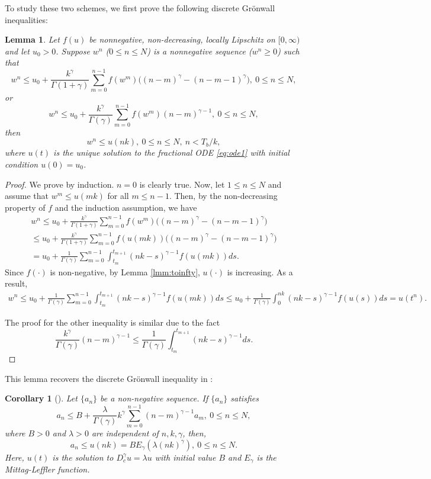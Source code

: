 \documentclass[12pt]{amsart}%
\newtheorem{lmm}[thm]{Lemma}
\newtheorem{cor}[thm]{Corollary}
\theoremstyle{definition}
\theoremstyle{remark}
\renewcommand{\ge}{\geqslant}
\renewcommand{\le}{\leqslant}
\begin{document}
To study these two schemes, we first prove the following discrete Gr\"{o}nwall inequalities:
\begin{lmm}\label{lmm:discretegronwall1}
Let $f(u)$ be nonnegative, non-decreasing, locally Lipschitz on $[0,\infty)$ and let $u_0>0$. 
Suppose $w^n$ ($0\le n\le N$) is a nonnegative sequence ($w^n\ge 0$) such that 
\[
w^{n}\le u_0+\frac{k^{\gamma}}{\Gamma(1+\gamma)}\sum_{m=0}^{n-1} f(w^{m})\Big((n-m)^{\gamma}-(n-m-1)^{\gamma}\Big),
~ 0\le n\le N,
\] 
or 
\[
w^{n}\le u_0+\frac{k^{\gamma}}{\Gamma(\gamma)}\sum_{m=0}^{n-1} f(w^{m})(n-m)^{\gamma-1},~  0\le n\le N,
\]
then \[
w^n \le u(nk),~ 0\le n\le N,~n<T_b/k,
\]
where $u(t)$ is the unique solution to the fractional ODE \eqref{eq:ode1} with initial condition $u(0)=u_0$.
\end{lmm}

\begin{proof}
We prove by induction. $n=0$ is clearly true. Now, let $1\le n \le N$ and assume that $w^m\le u(mk)$ for all $m\le n-1$. Then, by the non-decreasing property of $f$ and the induction assumption, we have
\begin{multline*}
w^{n}\le u_0+\frac{k^{\gamma}}{\Gamma(1+\gamma)}\sum_{m=0}^{n-1} f(w^{m})\Big((n-m)^{\gamma}-(n-m-1)^{\gamma}\Big)\\
\le u_0+\frac{k^{\gamma}}{\Gamma(1+\gamma)}\sum_{m=0}^{n-1} f(u(mk))\Big((n-m)^{\gamma}-(n-m-1)^{\gamma}\Big)\\
=u_0+\frac{1}{\Gamma(\gamma)}\sum_{m=0}^{n-1} \int_{t_{m}}^{t_{m+1}}
(nk-s)^{\gamma-1}f(u(mk))ds.
\end{multline*} 
Since $f(\cdot)$ is non-negative, by Lemma \ref{lmm:toinfty}, $u(\cdot)$ is increasing. As a result,
\begin{multline*}
w^{n}\le u_0+\frac{1}{\Gamma(\gamma)}\sum_{m=0}^{n-1} \int_{t_{m}}^{t_{m+1}}
(nk-s)^{\gamma-1}f(u(mk))ds
\le u_0+\frac{1}{\Gamma(\gamma)}\int_0^{nk}(nk-s)^{\gamma-1}f(u(s))ds=u(t^n).
\end{multline*}


The proof for the other inequality is similar due to the fact \[
\frac{k^{\gamma}}{\Gamma(\gamma)}(n-m)^{\gamma-1}\le \frac{1}{\Gamma(\gamma)} \int_{t_{m}}^{t_{m+1}}
(nk-s)^{\gamma-1} ds.
\]
\end{proof}

This lemma recovers the discrete Gr\"{o}nwall inequality in \cite{dixon86}:
\begin{cor}[\cite{dixon86}]
Let $\{a_n\}$ be a non-negative sequence.  If $\{a_n\}$ satisfies $$
a_n\le B+\frac{\lambda}{\Gamma(\gamma)}k^{\gamma}\sum_{m=0}^{n-1}(n-m)^{\gamma-1}a_m,~0\le n\le N,
$$
where $B>0$ and $\lambda>0$ are independent of $n, k, \gamma$, then, $$
a_n\le u(nk)=BE_{\gamma}(\lambda(nk)^{\gamma}),~0\le n\le N.
$$
Here, $u(t)$ is the solution to $D_c^{\gamma}u=\lambda u$ with initial value $B$ and $E_{\gamma}$ is the Mittag-Leffler function.
\end{cor}
\end{document}
